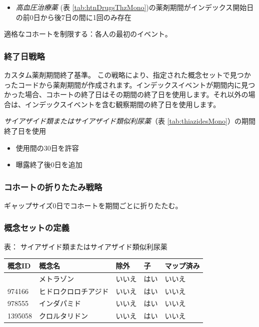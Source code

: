 \documentclass[
  11pt]{book}
\providecommand{\tightlist}{%
  \setlength{\itemsep}{0pt}\setlength{\parskip}{0pt}}
\theoremstyle{definition}
\theoremstyle{definition}
\theoremstyle{definition}
\theoremstyle{definition}
\theoremstyle{remark}
\begin{document}
\begin{itemize}
\tightlist
\item
  \emph{高血圧治療薬} (表 \ref{tab:htnDrugsThzMono})の薬剤期間がインデックス開始日の前0日から後7日の間に1回のみ存在
\end{itemize}

適格なコホートを制限する：各人の最初のイベント。

\subsubsection*{終了日戦略}\label{ux7d42ux4e86ux65e5ux6226ux7565-1}

カスタム薬剤期間終了基準。
この戦略により、指定された概念セットで見つかったコードから薬剤期間が作成されます。インデックスイベントが期間内に見つかった場合、コホートの終了日はその期間の終了日を使用します。それ以外の場合は、インデックスイベントを含む観察期間の終了日を使用します。

\emph{サイアザイド類またはサイアザイド類似利尿薬}（表 \ref{tab:thiazidesMono}）の期間終了日を使用

\begin{itemize}
\tightlist
\item
  使用間の30日を許容
\item
  曝露終了後0日を追加
\end{itemize}

\subsubsection*{コホートの折りたたみ戦略}\label{ux30b3ux30dbux30fcux30c8ux306eux6298ux308aux305fux305fux307fux6226ux7565-1}

ギャップサイズ0日でコホートを期間ごとに折りたたむ。

\subsubsection*{概念セットの定義}\label{ux6982ux5ff5ux30bbux30c3ux30c8ux306eux5b9aux7fa9-1}

表：\label{tab:thiazidesMono} サイアザイド類またはサイアザイド類似利尿薬

\begin{longtable}[]{@{}lllll@{}}
\toprule\noalign{}
概念ID & 概念名 & 除外 & 子 & マップ済み \\
\midrule\noalign{}
\endhead
\bottomrule\noalign{}
\endlastfoot
907013 & メトラゾン & いいえ & はい & いいえ \\
974166 & ヒドロクロロチアジド & いいえ & はい & いいえ \\
978555 & インダパミド & いいえ & はい & いいえ \\
1395058 & クロルタリドン & いいえ & はい & いいえ \\
\end{longtable}
\end{document}

